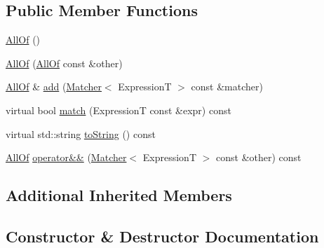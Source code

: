 \subsection*{Public Member Functions}
\begin{DoxyCompactItemize}
\item 
\hyperlink{class_catch_1_1_matchers_1_1_impl_1_1_generic_1_1_all_of_a9dfcc2f0549114f3b50cc65a2e10c996}{All\+Of} ()
\item 
\hyperlink{class_catch_1_1_matchers_1_1_impl_1_1_generic_1_1_all_of_a31f7c5e570e79bdf64064ee87c331a59}{All\+Of} (\hyperlink{class_catch_1_1_matchers_1_1_impl_1_1_generic_1_1_all_of}{All\+Of} const \&other)
\item 
\hyperlink{class_catch_1_1_matchers_1_1_impl_1_1_generic_1_1_all_of}{All\+Of} \& \hyperlink{class_catch_1_1_matchers_1_1_impl_1_1_generic_1_1_all_of_a8c5cd1e494ab697076da418ee72ac297}{add} (\hyperlink{struct_catch_1_1_matchers_1_1_impl_1_1_matcher}{Matcher}$<$ ExpressionT $>$ const \&matcher)
\item 
virtual bool \hyperlink{class_catch_1_1_matchers_1_1_impl_1_1_generic_1_1_all_of_a95231b6a455e1a646d0b54bce55138be}{match} (ExpressionT const \&expr) const
\item 
virtual std\+::string \hyperlink{class_catch_1_1_matchers_1_1_impl_1_1_generic_1_1_all_of_a8c8e7742501dc81e51a3c745d6f74119}{to\+String} () const
\item 
\hyperlink{class_catch_1_1_matchers_1_1_impl_1_1_generic_1_1_all_of}{All\+Of} \hyperlink{class_catch_1_1_matchers_1_1_impl_1_1_generic_1_1_all_of_aca6497aaa7fdb6560ebe850f32ccbf15}{operator\&\&} (\hyperlink{struct_catch_1_1_matchers_1_1_impl_1_1_matcher}{Matcher}$<$ ExpressionT $>$ const \&other) const
\end{DoxyCompactItemize}
\subsection*{Additional Inherited Members}


\subsection{Constructor \& Destructor Documentation}
\hypertarget{class_catch_1_1_matchers_1_1_impl_1_1_generic_1_1_all_of_a9dfcc2f0549114f3b50cc65a2e10c996}{}\label{class_catch_1_1_matchers_1_1_impl_1_1_generic_1_1_all_of_a9dfcc2f0549114f3b50cc65a2e10c996} 
